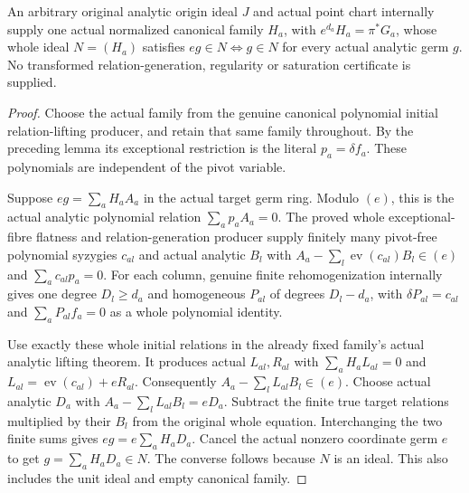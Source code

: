\begin{theorem}
\label{hir:actual-original-point-normalized-exceptional-regularity}
\leanok
An arbitrary original analytic origin ideal $J$ and actual point chart
internally supply one actual normalized canonical family $H_a$, with
$e^{d_a}H_a=\pi^*G_a$, whose whole ideal $N=(H_a)$ satisfies
$eg\in N\iff g\in N$ for every actual analytic germ $g$.
No transformed relation-generation, regularity or saturation certificate
is supplied.
\end{theorem}
\begin{proof}
Choose the actual family from the genuine canonical polynomial initial
relation-lifting producer, and retain that same family throughout. By
the preceding lemma its exceptional restriction is the literal
$p_a=\delta f_a$. These polynomials are independent of the pivot variable.

Suppose $eg=\sum_a H_aA_a$ in the actual target germ ring. Modulo $(e)$,
this is the actual analytic polynomial relation $\sum_a p_aA_a=0$.
The proved whole exceptional-fibre flatness and relation-generation
producer supply finitely many pivot-free polynomial syzygies $c_{al}$
and actual analytic $B_l$ with
$A_a-\sum_l\operatorname{ev}(c_{al})B_l\in(e)$ and
$\sum_a c_{al}p_a=0$. For each column, genuine finite rehomogenization
internally gives one degree $D_l\ge d_a$ and homogeneous $P_{al}$ of
degrees $D_l-d_a$, with $\delta P_{al}=c_{al}$ and
$\sum_aP_{al}f_a=0$ as a whole polynomial identity.

Use exactly these whole initial relations in the already fixed family's
actual analytic lifting theorem. It produces actual $L_{al},R_{al}$
with $\sum_aH_aL_{al}=0$ and
$L_{al}=\operatorname{ev}(c_{al})+eR_{al}$. Consequently
$A_a-\sum_lL_{al}B_l\in(e)$. Choose actual analytic $D_a$ with
$A_a-\sum_lL_{al}B_l=eD_a$. Subtract the finite true target relations
multiplied by their $B_l$ from the original whole equation. Interchanging
the two finite sums gives $eg=e\sum_aH_aD_a$. Cancel the actual nonzero
coordinate germ $e$ to get $g=\sum_aH_aD_a\in N$. The converse follows
because $N$ is an ideal. This also includes the unit ideal and empty
canonical family.
\end{proof}

